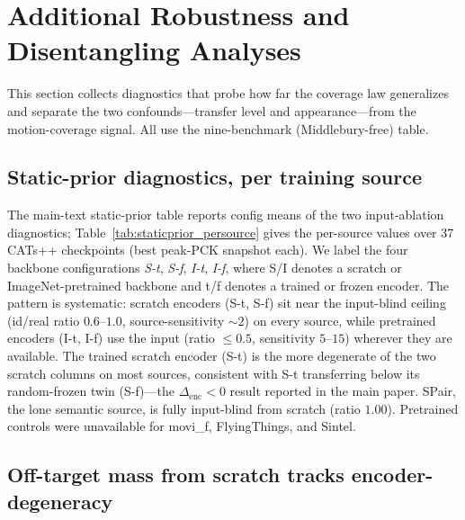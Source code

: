 \documentclass[runningheads]{llncs}
\newcommand{\pck}{PCK}
\begin{document}
\section{Additional Robustness and Disentangling Analyses}
\label{supp:newrobust}
This section collects diagnostics that probe how far the coverage law
generalizes and separate the two confounds---transfer level and
appearance---from the motion-coverage signal. All use the nine-benchmark
(Middlebury-free) table.

\subsection{Static-prior diagnostics, per training source}
The main-text static-prior table reports config means of the two input-ablation
diagnostics; Table~\ref{tab:staticprior_persource} gives the per-source values
over 37 CATs++ checkpoints (best peak-\pck{} snapshot each). We label the four
backbone configurations \emph{S-t}, \emph{S-f}, \emph{I-t}, \emph{I-f}, where
S/I denotes a scratch or ImageNet-pretrained backbone and t/f denotes a trained
or frozen encoder. The pattern is systematic: scratch encoders (S-t, S-f) sit
near the input-blind ceiling (id/real ratio $0.6$--$1.0$, source-sensitivity
${\sim}2$) on every source, while pretrained encoders (I-t, I-f) use the input
(ratio ${\le}0.5$, sensitivity $5$--$15$) wherever they are available. The
trained scratch encoder (S-t) is the more degenerate of the two scratch columns
on most sources, consistent with S-t transferring below its random-frozen twin
(S-f)---the $\Delta_{\text{enc}}<0$ result reported in the main paper.
SPair, the lone semantic source, is fully input-blind from scratch (ratio
$1.00$). Pretrained controls were unavailable for movi\_f, FlyingThings, and
Sintel.

\begin{table}[h]\centering\small\setlength{\tabcolsep}{4pt}

\caption{Per-source input-ablation diagnostics (CATs++, best snapshots).
id/real flow ratio (${\to}1$ input-blind) and source-sensitivity (high $=$ uses
the input), by training source and backbone configuration. Columns: S/I $=$
scratch / ImageNet-pretrained backbone, t/f $=$ trained / frozen encoder.}
\label{tab:staticprior_persource}
\end{table}

\subsection{Off-target mass from scratch tracks encoder-degeneracy}
\end{document}
